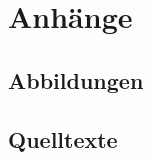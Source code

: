 \renewcommand\thesection{A.\arabic{section}}
\renewcommand\thesubsection{\thesection.\arabic{subsection}}

\chapter*{Anhänge}
\label{chap:APPENDIX}

\setcounter{page}{1}
\renewcommand{\thepage}{A-\arabic{page}}


\section{Abbildungen}
\label{sec:APPENDIX_FIGURES}

\section{Quelltexte}
\label{sec:APPENDIX_LISTINGS}

\renewcommand{\baselinestretch}{1}

\clearpage
